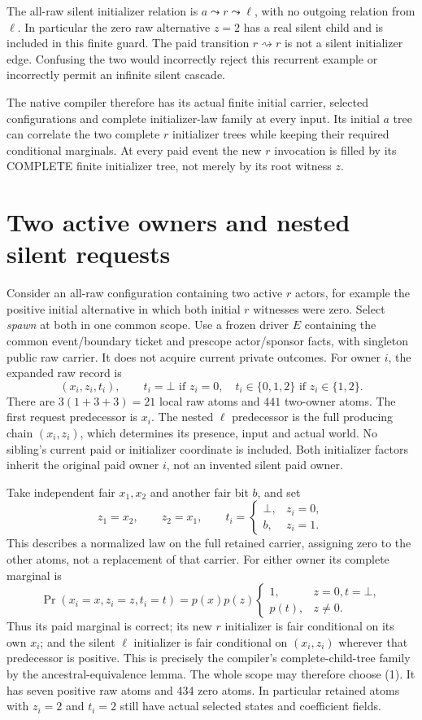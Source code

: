 \documentclass[11pt]{article}
\begin{document}
The all-raw silent initializer relation is $a\leadsto r\leadsto\ell$, with no outgoing relation from $\ell$. In particular the zero raw alternative $z=2$ has a real silent child and is included in this finite guard. The paid transition $r\rightsquigarrow r$ is not a silent initializer edge. Confusing the two would incorrectly reject this recurrent example or incorrectly permit an infinite silent cascade.

The native compiler therefore has its actual finite initial carrier, selected configurations and complete initializer-law family at every input. Its initial $a$ tree can correlate the two complete $r$ initializer trees while keeping their required conditional marginals. At every paid event the new $r$ invocation is filled by its COMPLETE finite initializer tree, not merely by its root witness $z$.

\section{Two active owners and nested silent requests}
Consider an all-raw configuration containing two active $r$ actors, for example the positive initial alternative in which both initial $r$ witnesses were zero. Select \emph{spawn} at both in one common scope. Use a frozen driver $E$ containing the common event/boundary ticket and prescope actor/sponsor facts, with singleton public raw carrier. It does not acquire current private outcomes. For owner $i$, the expanded raw record is
\[
 (x_i,z_i,t_i),\qquad t_i=\bot\text{ if }z_i=0,
 \quad t_i\in\{0,1,2\}\text{ if }z_i\in\{1,2\}.
\]
There are $3(1+3+3)=21$ local raw atoms and $441$ two-owner atoms. The first request predecessor is $x_i$. The nested $\ell$ predecessor is the full producing chain $(x_i,z_i)$, which determines its presence, input and actual world. No sibling's current paid or initializer coordinate is included. Both initializer factors inherit the original paid owner $i$, not an invented silent paid owner.

Take independent fair $x_1,x_2$ and another fair bit $b$, and set
\[
 z_1=x_2,\qquad z_2=x_1,\qquad
 t_i=\begin{cases}\bot,&z_i=0,\\b,&z_i=1.\end{cases}        \tag{1}
\]
This describes a normalized law on the full retained carrier, assigning zero to the other atoms, not a replacement of that carrier. For either owner its complete marginal is
\[
 \Pr(x_i=x,z_i=z,t_i=t)=p(x)p(z)
 \begin{cases}1,&z=0,t=\bot,\\p(t),&z\ne0.\end{cases}     \tag{2}
\]
Thus its paid marginal is correct; its new $r$ initializer is fair conditional on its own $x_i$; and the silent $\ell$ initializer is fair conditional on $(x_i,z_i)$ wherever that predecessor is positive. This is precisely the compiler's complete-child-tree family by the ancestral-equivalence lemma. The whole scope may therefore choose (1). It has seven positive raw atoms and 434 zero atoms. In particular retained atoms with $z_i=2$ and $t_i=2$ still have actual selected states and coefficient fields.
\end{document}
